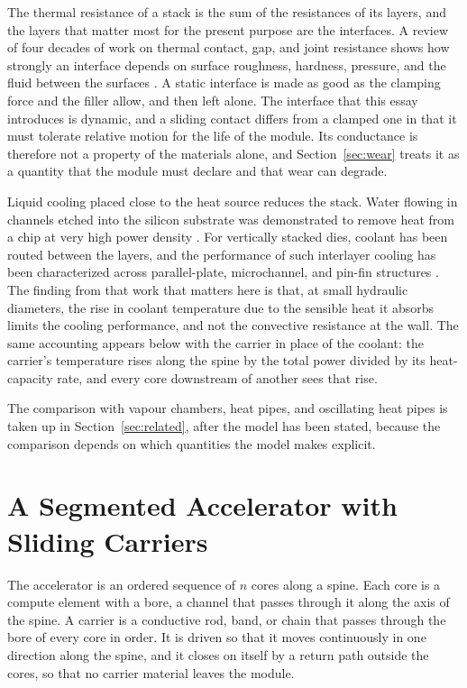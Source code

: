 \documentclass[11pt]{article}
\theoremstyle{definition}
\theoremstyle{plain}
\theoremstyle{remark}
\begin{document}
The thermal resistance of a stack is the sum of the resistances of its layers, and the layers that matter most for the present purpose are the interfaces. A review of four decades of work on thermal contact, gap, and joint resistance shows how strongly an interface depends on surface roughness, hardness, pressure, and the fluid between the surfaces \cite{yovanovich}. A static interface is made as good as the clamping force and the filler allow, and then left alone. The interface that this essay introduces is dynamic, and a sliding contact differs from a clamped one in that it must tolerate relative motion for the life of the module. Its conductance is therefore not a property of the materials alone, and Section~\ref{sec:wear} treats it as a quantity that the module must declare and that wear can degrade.

Liquid cooling placed close to the heat source reduces the stack. Water flowing in channels etched into the silicon substrate was demonstrated to remove heat from a chip at very high power density \cite{tuckerman}. For vertically stacked dies, coolant has been routed between the layers, and the performance of such interlayer cooling has been characterized across parallel-plate, microchannel, and pin-fin structures \cite{brunschwiler}. The finding from that work that matters here is that, at small hydraulic diameters, the rise in coolant temperature due to the sensible heat it absorbs limits the cooling performance, and not the convective resistance at the wall. The same accounting appears below with the carrier in place of the coolant: the carrier's temperature rises along the spine by the total power divided by its heat-capacity rate, and every core downstream of another sees that rise.

The comparison with vapour chambers, heat pipes, and oscillating heat pipes is taken up in Section~\ref{sec:related}, after the model has been stated, because the comparison depends on which quantities the model makes explicit.

\section{A Segmented Accelerator with Sliding Carriers}
\label{sec:arch}

The accelerator is an ordered sequence of $n$ cores along a spine. Each core is a compute element with a bore, a channel that passes through it along the axis of the spine. A carrier is a conductive rod, band, or chain that passes through the bore of every core in order. It is driven so that it moves continuously in one direction along the spine, and it closes on itself by a return path outside the cores, so that no carrier material leaves the module.
\end{document}
